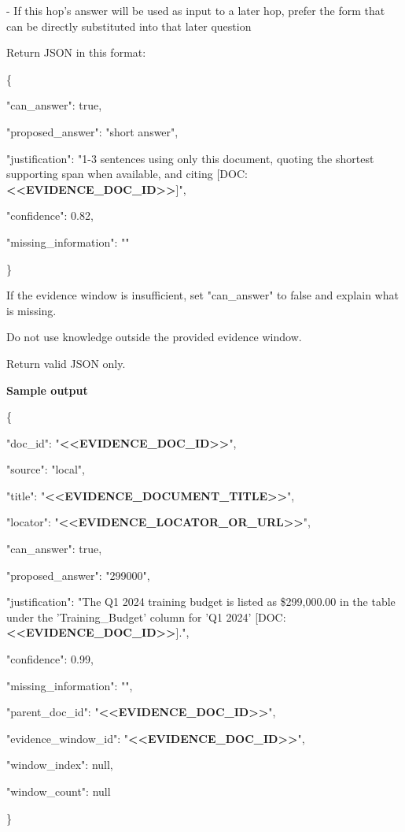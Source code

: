 \begin{tcolorbox}
\begin{scriptsize}
- If this hop's answer will be used as input to a later hop, prefer the form that can be directly substituted into that later question\par
\mbox{}\par
Return JSON in this format:\par
\{\par
  "can\_answer": true,\par
  "proposed\_answer": "short answer",\par
  "justification": "1-3 sentences using only this document, quoting the shortest supporting span when available, and citing [DOC:\textcolor{my-green}{\textbf{\textless{}\textless{}EVIDENCE\_DOC\_ID\textgreater{}\textgreater{}}}]",\par
  "confidence": 0.82,\par
  "missing\_information": ""\par
\}\par
\mbox{}\par
If the evidence window is insufficient, set "can\_answer" to false and explain what is missing.\par
Do not use knowledge outside the provided evidence window.\par
Return valid JSON only.\par
\medskip
\normalfont\textbf{Sample output}\par
\ttfamily
\{\par
  "doc\_id": "\textcolor{my-green}{\textbf{\textless{}\textless{}EVIDENCE\_DOC\_ID\textgreater{}\textgreater{}}}",\par
  "source": "local",\par
  "title": "\textcolor{my-green}{\textbf{\textless{}\textless{}EVIDENCE\_DOCUMENT\_TITLE\textgreater{}\textgreater{}}}",\par
  "locator": "\textcolor{my-green}{\textbf{\textless{}\textless{}EVIDENCE\_LOCATOR\_OR\_URL\textgreater{}\textgreater{}}}",\par
  "can\_answer": true,\par
  "proposed\_answer": "299000",\par
  "justification": "The Q1 2024 training budget is listed as \$299,000.00 in the table under the 'Training\_Budget' column for 'Q1 2024' [DOC:\textcolor{my-green}{\textbf{\textless{}\textless{}EVIDENCE\_DOC\_ID\textgreater{}\textgreater{}}}].",\par
  "confidence": 0.99,\par
  "missing\_information": "",\par
  "parent\_doc\_id": "\textcolor{my-green}{\textbf{\textless{}\textless{}EVIDENCE\_DOC\_ID\textgreater{}\textgreater{}}}",\par
  "evidence\_window\_id": "\textcolor{my-green}{\textbf{\textless{}\textless{}EVIDENCE\_DOC\_ID\textgreater{}\textgreater{}}}",\par
  "window\_index": null,\par
  "window\_count": null\par
\}\par
\end{scriptsize}
\end{tcolorbox}

